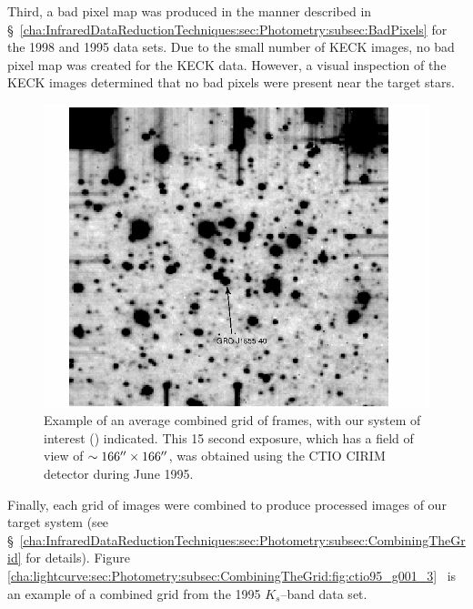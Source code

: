 Third, a bad pixel map was produced in the manner described in \S~\ref{cha:InfraredDataReductionTechniques:sec:Photometry:subsec:BadPixels} for the 1998 and 1995 data sets. Due to the small number of KECK images, no bad pixel map was created
for the KECK data. However, a visual inspection of the KECK images
determined that no bad pixels were present near the target stars. %

\vspace{\myparskip}

\begin{figure}[!htb]
\begin{center}
\includegraphics[width=5.0in]{ctio95_g001_3}
\caption{%
Example of an average combined grid of frames, with our system of interest
(\mbox{\groj}) indicated. This 15 second exposure, which has a
field of view of $\sim 166\hbox{$^{\prime\prime}$} \times 166\hbox{$^{\prime\prime}$} $, was
obtained using the CTIO CIRIM detector during June 1995.}\label{cha:lightcurve:sec:Photometry:subsec:CombiningTheGrid:fig:ctio95_g001_3}
\end{center}
\end{figure}

Finally, each grid of images were combined to produce processed images of our target system (see \S~\vref{cha:InfraredDataReductionTechniques:sec:Photometry:subsec:CombiningTheGrid} for details). Figure~%
\vref{cha:lightcurve:sec:Photometry:subsec:CombiningTheGrid:fig:ctio95_g001_3}%
\ is an example of a combined grid from the 1995 $K_s$--band data set. %


